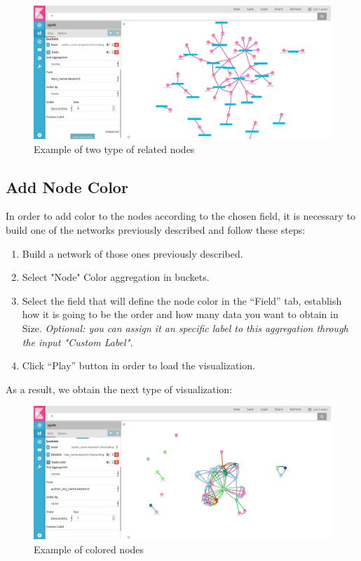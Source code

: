 \documentclass[a4paper, 12pt]{book}
\begin{document}
\begin{figure}[H]
  \centering
  \includegraphics[width=16cm, keepaspectratio]{img/results/nodenode}
  \caption{Example of two type of related nodes}
  \label{fig:nodenode}
\end{figure}

\subsection{Add Node Color}

In order to add color to the nodes according to the chosen field, it is necessary to build one of the networks previously described and follow these steps:

\begin{enumerate}
\item Build a network of those ones previously described.
\item Select "Node" Color aggregation in buckets.
\item Select the field that will define the node color in the “Field” tab, establish how it is going to be the order and how many data you want to obtain in Size. \textit{Optional: you can assign it an specific label to this aggregation through the input "Custom Label". }
\item Click “Play” button in order to load the visualization.
\end{enumerate}

As a result, we obtain the next type of visualization:

\begin{figure}[H]
  \centering
  \includegraphics[width=16cm, keepaspectratio]{img/results/nodecolor}
  \caption{Example of colored nodes}
  \label{fig:nodecolor}
\end{figure}
\end{document}
